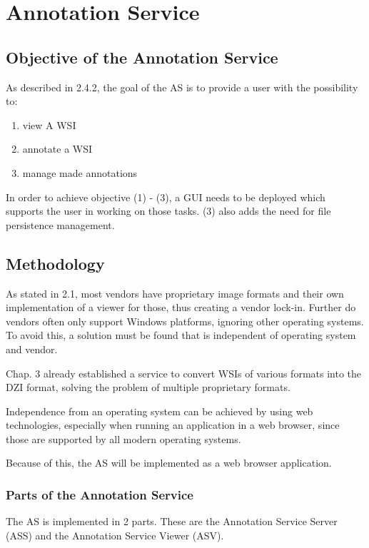 \chapter{Annotation Service}

\section{Objective of the Annotation Service}
As described in 2.4.2, the goal of the AS is to provide a user with the possibility to:
\begin{enumerate}[(1)]
	\item view A WSI
	\item annotate a WSI
	\item manage made annotations
\end{enumerate}

In order to achieve objective (1) - (3), a GUI needs to be deployed which supports the user in working on those tasks. (3) also adds the need for file persistence management.


\section{Methodology}
As stated in 2.1, most vendors have proprietary image formats and their own implementation of a viewer for those, thus creating a vendor lock-in. Further do vendors often only support Windows platforms, ignoring other operating systems\cite{Cornish13}\cite{DICOM10}\cite{Farahanil15}. To avoid this, a solution must be found that is independent of operating system and vendor.

Chap. 3 already established a service to convert WSIs of various formats into the DZI format, solving the problem of multiple proprietary formats. 

Independence from an operating system can be achieved by using web technologies, especially when running an application in a web browser\cite{Tseytlin14}, since those are supported by all modern operating systems. 

Because of this, the AS will be implemented as a web browser application. 


\subsection{Parts of the Annotation Service}
The AS is implemented in 2 parts. These are the Annotation Service Server (ASS) and the Annotation Service Viewer (ASV).

